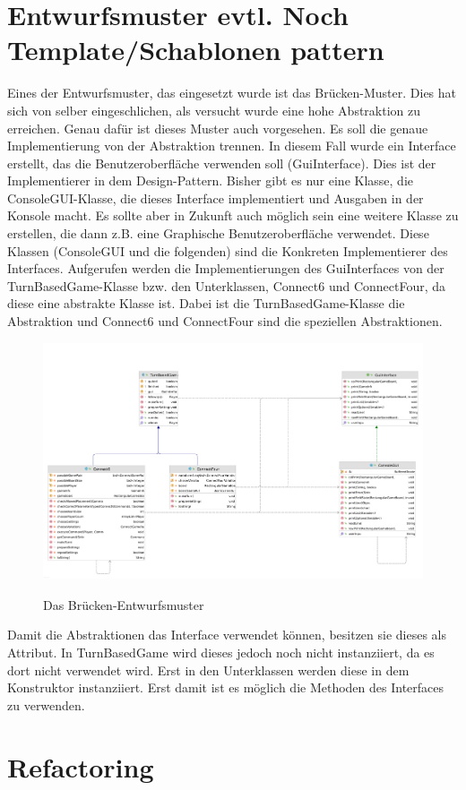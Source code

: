 \documentclass[12pt]{article}
\newcommand{\BridgePattern}{\includegraphics[height=7cm]{Bilder/Bridge_complete}}
\begin{document}
\newpage
\section{Entwurfsmuster evtl. Noch Template/Schablonen pattern}
Eines der Entwurfsmuster, das eingesetzt wurde ist das Brücken-Muster. Dies hat sich von selber eingeschlichen, als versucht wurde eine hohe Abstraktion zu erreichen. Genau dafür ist dieses Muster auch vorgesehen. Es soll die genaue Implementierung von der Abstraktion trennen. In diesem Fall wurde ein Interface erstellt, das die Benutzeroberfläche verwenden soll (GuiInterface). Dies ist der Implementierer in dem Design-Pattern. Bisher gibt es nur eine Klasse, die ConsoleGUI-Klasse, die dieses Interface implementiert und Ausgaben in der Konsole macht. Es sollte aber in Zukunft auch möglich sein eine weitere Klasse zu erstellen, die dann z.B. eine Graphische Benutzeroberfläche verwendet. Diese Klassen (ConsoleGUI und die folgenden) sind die Konkreten Implementierer des Interfaces. Aufgerufen werden die Implementierungen des GuiInterfaces von der TurnBasedGame-Klasse bzw. den Unterklassen, Connect6 und ConnectFour, da diese eine abstrakte Klasse ist. Dabei ist die TurnBasedGame-Klasse die Abstraktion und Connect6 und ConnectFour sind die speziellen Abstraktionen.

\begin{figure}[htpb!]
\centering
{\BridgePattern}\\[1cm]
\caption{Das Brücken-Entwurfsmuster}
\label{fig:bridge}
\end{figure}

Damit die Abstraktionen das Interface verwendet können, besitzen sie dieses als Attribut. In TurnBasedGame wird dieses jedoch noch nicht instanziiert, da es dort nicht verwendet wird. Erst in den Unterklassen werden diese in dem Konstruktor instanziiert. Erst damit ist es möglich die Methoden des Interfaces zu verwenden.

\newpage
\section{Refactoring}
\end{document}
